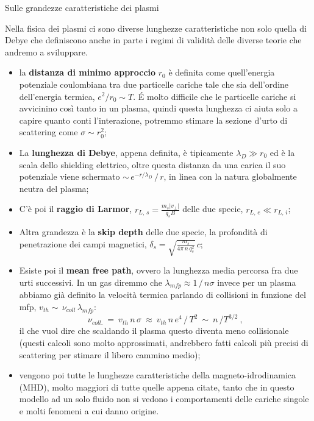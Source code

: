 %
%
\begin{approfondimento}{Sulle grandezze caratteristiche dei plasmi}
	
	Nella fisica dei plasmi ci sono diverse lunghezze caratteristiche non solo quella di Debye che definiscono anche in parte i regimi di validità delle diverse teorie che andremo a sviluppare.
	
	\begin{itemize}
		\item la \textbf{distanza di minimo approccio} $r_0$ è definita come quell'energia potenziale coulombiana tra due particelle cariche tale che sia dell'ordine dell'energia termica, $e^2/r_0 \sim T$. \'E molto difficile che le particelle cariche si avvicinino così tanto in un plasma, quindi questa lunghezza ci aiuta solo a capire quanto conti l'interazione, potremmo stimare la sezione d'urto di scattering come $\sigma\sim r_0^2$;
		
		\item La \textbf{lunghezza di Debye}, appena definita, è tipicamente $\lambda_D\gg r_0$ ed è la scala dello shielding elettrico, oltre questa distanza da una carica il suo potenziale viene schermato $\sim \,e^{-r/\lambda_D}\,/\,r$, in linea con la natura globalmente neutra del plasma;
		
		\item C'è poi il \textbf{raggio di Larmor}, $r_{L,\, s}=\displaystyle\frac{m_s |v_\perp|}{q_s B}$ delle due specie, $r_{L,\, e}\ll r_{L,\, i}$;
		
		\item Altra grandezza è la \textbf{skip depth} delle due specie, la profondità di penetrazione dei campi magnetici, $\delta_s = \displaystyle\sqrt{\frac{m_s}{4\pi\, n\, q_s^2}}\, c$;
		
		\item Esiste poi il \textbf{mean free path}, ovvero la lunghezza media percorsa fra due urti successivi. In un gas diremmo che $\lambda_{mfp} \approx 1\,/\, n\sigma$ invece per un plasma abbiamo già definito la velocità termica parlando di collisioni in funzione del mfp, $v_{th}\sim\, \nu_{coll}\,\lambda_{mfp}$: 
		\[ \nu_{coll.}\ =\ v_{th}\,n\,\sigma\ \approx\ v_{th}\, n\,e^4\, /\, T^2\ \sim \ n\, /T^{3/2}\ , \] il che vuol dire che scaldando il plasma questo diventa meno collisionale (questi calcoli sono molto approssimati, andrebbero fatti calcoli più precisi di scattering per stimare il libero cammino medio);
		
		\item vengono poi tutte le lunghezze caratteristiche della magneto-idrodinamica (MHD), molto maggiori di tutte quelle appena citate, tanto che in questo modello ad un solo fluido non si vedono i comportamenti delle cariche singole e molti fenomeni a cui danno origine.
	\end{itemize}
	

\end{approfondimento}
